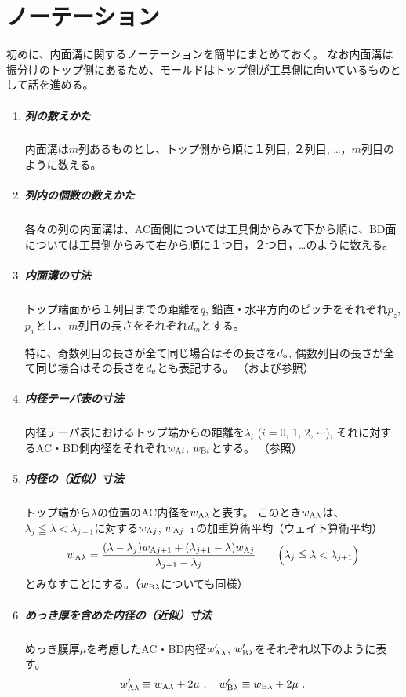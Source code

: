 \section{ノーテーション}
初めに、内面溝に関するノーテーションを簡単にまとめておく。
なお内面溝は振分けのトップ側にあるため、モールドはトップ側が工具側に向いているものとして話を進める。
\begin{tcolorbox}[title={内面溝に関するノーテーション}, fonttitle=\gtfamily\bfseries, breakable, enhanced jigsaw]
\begin{enumerate}
\item
\subparagraph{列の数えかた}
内面溝は$m$列あるものとし、トップ側から順に１列目, ２列目, …，$m$列目のように数える。

\item
\subparagraph{列内の個数の数えかた}
各々の列の内面溝は、AC面側については工具側からみて下から順に、BD面については工具側からみて右から順に１つ目，２つ目，…のように数える。

\item
\subparagraph{内面溝の寸法}
トップ端面から１列目までの距離を$q$, 鉛直・水平方向のピッチをそれぞれ$p_z$, $p_x$とし、$m$列目の長さをそれぞれ$d_m$とする。

特に、奇数列目の長さが全て同じ場合はその長さを$d_\text o$, 偶数列目の長さが全て同じ場合はその長さを$d_\text e$とも表記する。
（および参照）

\item
\subparagraph{内径テーパ表の寸法}
内径テーパ表におけるトップ端からの距離を$\lambda_i$ ($i = 0$, $1$, $2$, $\cdots$), それに対するAC・BD側内径をそれぞれ$w_{\text Ai}$, $w_{\text Bi}$とする。
（参照）

\item
\subparagraph{内径の（近似）寸法}
トップ端から$\lambda$の位置のAC内径を$w_{\text A\lambda}$と表す。
このとき$w_{\text A\lambda}$は、$\lambda_j \leqq \lambda < \lambda_{j+1}$に対する$w_{\text Aj}$, $w_{\text Aj+1}$の加重算術平均（ウェイト算術平均）
\begin{align*}
  w_{\text A\lambda}
   = \frac{(\lambda-\lambda_j)w_{\text Aj+1}+(\lambda_{j+1}-\lambda)w_{\text Aj}}{\lambda_{j+1}-\lambda_j} \qquad
  \Big(\lambda_j \leqq \lambda < \lambda_{j+1}\Big)
\end{align*}
とみなすことにする。（$w_{\text B\lambda}$についても同様）

\item
\subparagraph{めっき厚を含めた内径の（近似）寸法}
めっき膜厚$\mu$を考慮したAC・BD内径$w'_{\text A\lambda}$, $w'_{\text B\lambda}$をそれぞれ以下のように表す。
\begin{align*}
  w'_{\text A\lambda} \equiv w_{\text A\lambda}+2\mu~, \quad
  w'_{\text B\lambda} \equiv w_{\text B\lambda}+2\mu~.
\end{align*}
\end{enumerate}
\end{tcolorbox}\noindent
